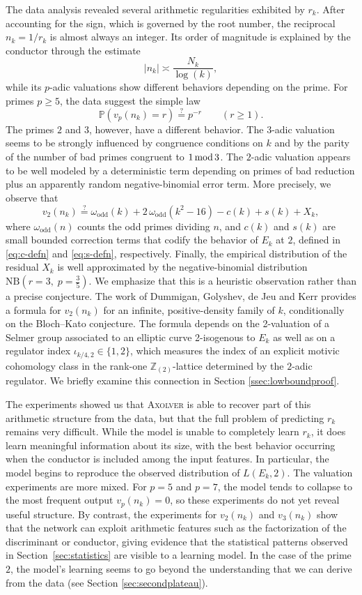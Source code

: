 \documentclass[12pt]{amsart}%
\renewcommand{\pmod}[1]{\hspace{0.05em}(\mathrm{mod}\,#1)}
\newcommand{\1}{\mathds{1}}
\renewcommand{\pmod}[1]{\,{\rm mod}\,#1}
\newcommand{\Z}{\mathbb{Z}}
\theoremstyle{definition}
\numberwithin{equation}{section}
\numberwithin{table}{section}
\numberwithin{figure}{section}
\begin{document}
The data analysis
revealed several arithmetic regularities
exhibited by $r_k$. After accounting for the sign, which is governed by the root number, the reciprocal $n_k=1/r_k$ is almost always an integer. Its order of magnitude is explained by the conductor through the estimate
\[
        |n_k|\asymp \frac{N_k}{\log (k)},
\]
while its $p$-adic valuations show different behaviors depending on the prime. For primes $p\geq 5$, the data suggest the simple law
\[
        \mathbb{P}(v_p(n_k)=r)\stackrel{?}{=}p^{-r}\qquad (r\geq 1).
\]
The primes $2$ and $3$, however, have a different behavior. The $3$-adic valuation seems to be strongly influenced by congruence conditions on $k$ and by the parity of the number of bad primes congruent to $1\pmod 3$. The $2$-adic valuation appears to be  well modeled by a deterministic term depending on primes of bad reduction plus an apparently random negative-binomial error term.%
More precisely, we observe that
\[v_2(n_k) \overset{?}{=} \omega_{\mathrm{odd}}(k) + 2\,\omega_{\mathrm{odd}}(k^2-16) - c(k) + s(k) + X_k,\]
where $\omega_{\mathrm{odd}}(n)$ counts the odd primes dividing $n$, and
$c(k)$ and $s(k)$ are small bounded correction terms that codify the behavior of $E_k$ at $2$, defined in \eqref{eq:c-defn} and \eqref{eq:s-defn}, respectively.
Finally, the empirical distribution of the residual $X_k$ is well approximated by the negative-binomial distribution
 $\mathrm{NB}\!\left(r=3,\;p=\tfrac{3}{5}\right)$. We emphasize that this is a heuristic observation rather than a precise conjecture. The work of Dummigan, Golyshev, de Jeu and Kerr \cite{DGJK}
provides a formula for $v_2(n_k)$ for an infinite, positive-density
family of $k$, conditionally on the Bloch--Kato conjecture. The formula
depends on the 2-valuation of a Selmer group associated to an elliptic curve 2-isogenous to $E_k$
as well as on a regulator index
$\iota_{k/4,2}\in\{1,2\}$, which measures the index of an explicit
motivic cohomology class in the rank-one $\Z_{(2)}$-lattice determined
by the $2$-adic regulator. We briefly examine this connection in Section \ref{ssec:lowboundproof}.


The experiments showed us that \textsc{Axolver} is able to recover part of this arithmetic structure from the data, but that the full problem of predicting $r_k$ remains very difficult. While the model is unable to completely learn $r_k$, it  does learn meaningful information about its size, with the best behavior occurring when the conductor is included among the input features. In particular, the model begins to reproduce the observed distribution of $L(E_k,2)$. The valuation experiments are more mixed. For $p=5$ and $p=7$, the model tends to collapse to the most frequent output $v_p(n_k) = 0$, so these experiments do not yet reveal useful structure. By contrast, the experiments for $v_2(n_k)$ and $v_3(n_k)$ show that the network can exploit arithmetic features such as the factorization of the discriminant or conductor, giving evidence that the statistical patterns observed in Section~\ref{sec:statistics} are visible to a learning model. In the case of the prime $2$, the model's learning seems to go beyond the understanding that we can derive from the data  (see Section \ref{sec:secondplateau}).
\end{document}
